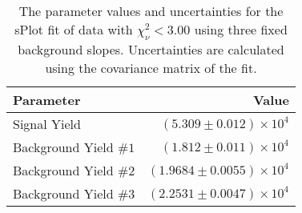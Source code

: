 
\begin{table}[ht]
    \begin{center}
        \begin{tabular}{lr}\toprule
            Parameter & Value \\\midrule
            Signal Yield & $(5.309 \pm 0.012) \times 10^{4}$ \\
            Background Yield $\#1$ & $(1.812 \pm 0.011) \times 10^{4}$ \\
            Background Yield $\#2$ & $(1.9684 \pm 0.0055) \times 10^{4}$ \\
            Background Yield $\#3$ & $(2.2531 \pm 0.0047) \times 10^{4}$ \\\bottomrule
        \end{tabular}
        \caption{The parameter values and uncertainties for the sPlot fit of data with $\chi^2_\nu < 3.00$ using three fixed background slopes. Uncertainties are calculated using the covariance matrix of the fit.}\label{tab:splot-fit-results-chisqdof-3.00-fixed-3}
    \end{center}
\end{table}
